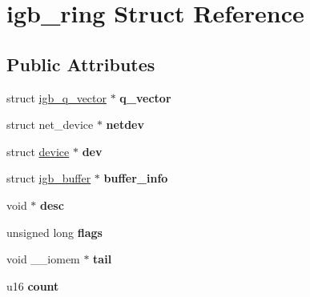 \hypertarget{structigb__ring}{
\section{igb\_\-ring Struct Reference}
\label{structigb__ring}
}
\subsection*{Public Attributes}
\begin{DoxyCompactItemize}
\item 
\hypertarget{structigb__ring_acd8e87278f60d87fa7de1c715c8d0c12}{
struct \hyperlink{structigb__q__vector}{igb\_\-q\_\-vector} $\ast$ {\bfseries q\_\-vector}}
\label{structigb__ring_acd8e87278f60d87fa7de1c715c8d0c12}

\item 
\hypertarget{structigb__ring_a981236e121a479d2dcea013cea9bc97f}{
struct net\_\-device $\ast$ {\bfseries netdev}}
\label{structigb__ring_a981236e121a479d2dcea013cea9bc97f}

\item 
\hypertarget{structigb__ring_a8b15ac965590d87816a3c926cf437ba9}{
struct \hyperlink{structdevice}{device} $\ast$ {\bfseries dev}}
\label{structigb__ring_a8b15ac965590d87816a3c926cf437ba9}

\item 
\hypertarget{structigb__ring_aac5197300c232c380fad1a0a351aec07}{
struct \hyperlink{structigb__buffer}{igb\_\-buffer} $\ast$ {\bfseries buffer\_\-info}}
\label{structigb__ring_aac5197300c232c380fad1a0a351aec07}

\item 
\hypertarget{structigb__ring_a2e0b5223899fc7348cf9b3c004589127}{
void $\ast$ {\bfseries desc}}
\label{structigb__ring_a2e0b5223899fc7348cf9b3c004589127}

\item 
\hypertarget{structigb__ring_ac9e4e9fb1ce1bf0a2064ad542d9f23f6}{
unsigned long {\bfseries flags}}
\label{structigb__ring_ac9e4e9fb1ce1bf0a2064ad542d9f23f6}

\item 
\hypertarget{structigb__ring_aafb77c6b5f8fd4b3e3f6a4d904d80a15}{
void \_\-\_\-iomem $\ast$ {\bfseries tail}}
\label{structigb__ring_aafb77c6b5f8fd4b3e3f6a4d904d80a15}

\item 
\hypertarget{structigb__ring_ad9172d05bd21f453d0c61af24ce37643}{
u16 {\bfseries count}}
\label{structigb__ring_ad9172d05bd21f453d0c61af24ce37643}


\end{DoxyCompactItemize}
